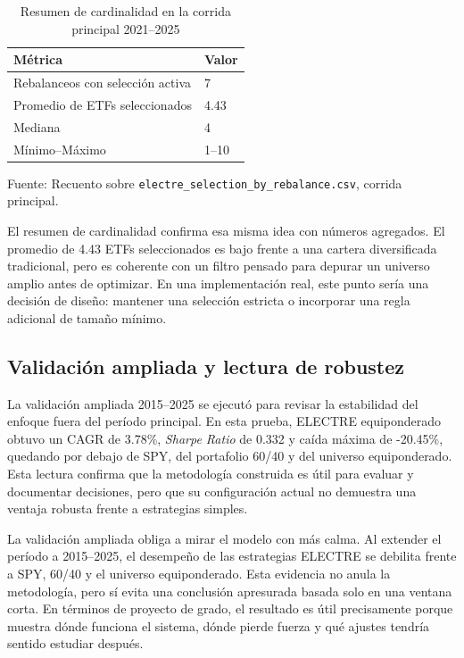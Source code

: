 \documentclass[12pt,letterpaper]{article}
\newcommand{\fuente}[1]{\begin{center}\small Fuente: #1\end{center}}
\begin{document}
\begin{table}[H]
\centering
\caption{Resumen de cardinalidad en la corrida principal 2021--2025}
\label{tab:cardinalidad_resumen_principal}
\begin{tabular}{p{5.2cm}p{2.8cm}}
\toprule
\textbf{Métrica} & \textbf{Valor} \\
\midrule
Rebalanceos con selección activa & 7 \\
Promedio de ETFs seleccionados & 4.43 \\
Mediana & 4 \\
Mínimo--Máximo & 1--10 \\
\bottomrule
\end{tabular}
\end{table}
\fuente{Recuento sobre \texttt{electre\_selection\_by\_rebalance.csv}, corrida principal.}

El resumen de cardinalidad confirma esa misma idea con números agregados. El promedio de 4.43 ETFs seleccionados es bajo frente a una cartera diversificada tradicional, pero es coherente con un filtro pensado para depurar un universo amplio antes de optimizar. En una implementación real, este punto sería una decisión de diseño: mantener una selección estricta o incorporar una regla adicional de tamaño mínimo.

\subsection{Validación ampliada y lectura de robustez}

La validación ampliada 2015--2025 se ejecutó para revisar la estabilidad del enfoque fuera del período principal. En esta prueba, ELECTRE equiponderado obtuvo un CAGR de 3.78\%, \textit{Sharpe Ratio} de 0.332 y caída máxima de -20.45\%, quedando por debajo de SPY, del portafolio 60/40 y del universo equiponderado. Esta lectura confirma que la metodología construida es útil para evaluar y documentar decisiones, pero que su configuración actual no demuestra una ventaja robusta frente a estrategias simples.

La validación ampliada obliga a mirar el modelo con más calma. Al extender el período a 2015--2025, el desempeño de las estrategias ELECTRE se debilita frente a SPY, 60/40 y el universo equiponderado. Esta evidencia no anula la metodología, pero sí evita una conclusión apresurada basada solo en una ventana corta. En términos de proyecto de grado, el resultado es útil precisamente porque muestra dónde funciona el sistema, dónde pierde fuerza y qué ajustes tendría sentido estudiar después.
\end{document}
